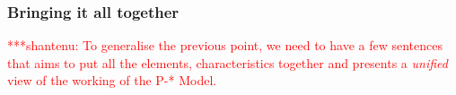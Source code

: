 \documentclass[conference,final]{IEEEtran}
\newcommand{\jhanote}[1]{ {\textcolor{red} { ***shantenu: #1 }}}
\newcommand{\alnote}[1]{ {\textcolor{blue} { ***andre: #1 }}}
\newcommand{\alnote}[1]{}
\newcommand{\jhanote}[1]{}
\begin{document}




\subsubsection*{Bringing it all together}

\jhanote{To generalise the previous point,
  we need to have a few sentences that aims to put all the elements,
  characteristics together and presents a {\it unified} view of the
  working of the P-* Model.}
  
\end{document}
